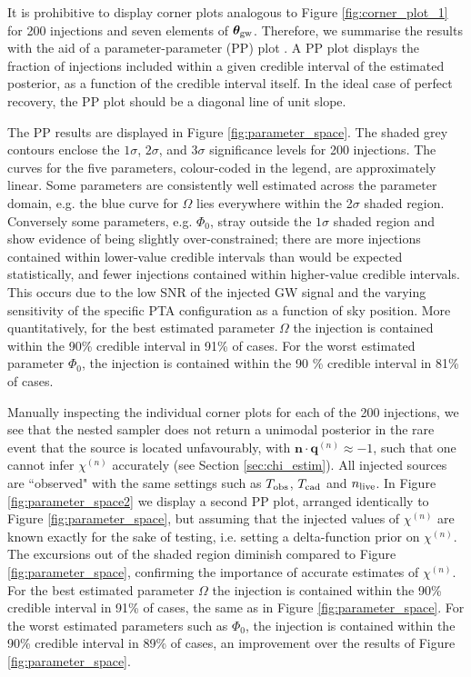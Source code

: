 \documentclass[fleqn,usenatbib,useAMS]{mnras}
\begin{document}
It is prohibitive to display corner plots analogous to Figure \ref{fig:corner_plot_1} for 200 injections and seven elements of $\boldsymbol{\theta}_{\rm gw}$. Therefore, we summarise the results with the aid of a parameter-parameter (PP) plot \citep{doi:10.1198/106186006X136976}. A PP plot displays the fraction of injections included within a given credible interval of the estimated posterior, as a function of the credible interval itself. In the ideal case of perfect recovery, the PP plot should be a diagonal line of unit slope. \newline 
 
The PP results are displayed in Figure \ref{fig:parameter_space}. The shaded grey contours enclose the $1\sigma$, $2\sigma$, and $3\sigma$ significance levels for 200 injections. The curves for the five parameters, colour-coded in the legend, are approximately linear. Some parameters are consistently well estimated across the parameter domain, e.g. the blue curve for $\Omega$ lies everywhere within the 2$\sigma$ shaded region. Conversely some parameters, e.g. $\Phi_0$, stray outside the $1\sigma$ shaded region and show evidence of being slightly over-constrained; there are more injections contained within lower-value credible intervals than would be expected statistically, and fewer injections contained within higher-value credible intervals. This occurs due to the low SNR of the injected GW signal and the varying sensitivity of the specific PTA configuration as a function of sky position. More quantitatively, for the best estimated parameter $\Omega$ the injection is contained within the 90\% credible interval in 91\% of cases. For the worst estimated parameter $\Phi_0$, the injection is contained within the 90 \% credible interval in 81\% of cases. \newline 

Manually inspecting the individual corner plots for each of the 200 injections, we see that the nested sampler does not return a unimodal posterior in the rare event that the source is located unfavourably, with $\boldsymbol{n} \cdot \boldsymbol{q}^{(n)} \approx -1$, such that one cannot infer $\chi^{(n)}$ accurately (see Section \ref{sec:chi_estim}). All injected sources are ``observed" with the same settings such as $T_{\rm obs}$, $T_{\rm cad}$ and $n_{\rm live}$. In Figure \ref{fig:parameter_space2} we display a second PP plot, arranged identically to Figure \ref{fig:parameter_space}, but assuming that the injected values of $\chi^{(n)}$ are known exactly for the sake of testing, i.e. setting a delta-function prior on $\chi^{(n)}$. The excursions out of the shaded region diminish compared to Figure \ref{fig:parameter_space}, confirming the importance of accurate estimates of $\chi^{(n)}$. For the best estimated parameter $\Omega$ the injection is contained within the 90\% credible interval in 91\% of cases, the same as in Figure \ref{fig:parameter_space}. For the worst estimated parameters such as $\Phi_0$, the injection is contained within the 90\% credible interval in 89\% of cases, an improvement over the results of Figure \ref{fig:parameter_space}. \newline 
\end{document}

